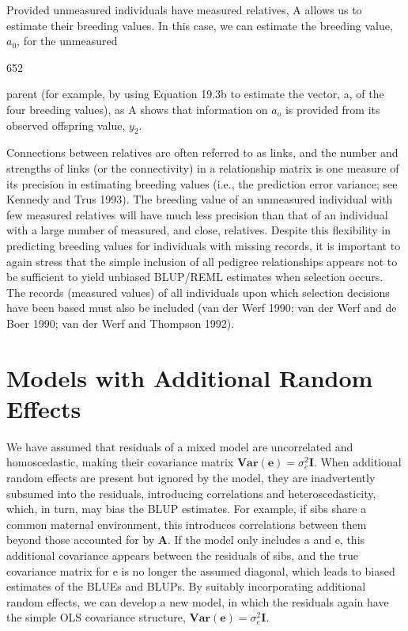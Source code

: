 \documentclass{article}
\begin{document}
Provided unmeasured individuals have measured relatives, A allows us to estimate their breeding values. In this case, we can estimate the breeding value,  $ a_{0} $, for the unmeasured

652

parent (for example, by using Equation 19.3b to estimate the vector, a, of the four breeding values), as A shows that information on  $ a_{o} $ is provided from its observed offspring value,  $ y_{2} $.

Connections between relatives are often referred to as links, and the number and strengths of links (or the connectivity) in a relationship matrix is one measure of its precision in estimating breeding values (i.e., the prediction error variance; see Kennedy and Trus 1993). The breeding value of an unmeasured individual with few measured relatives will have much less precision than that of an individual with a large number of measured, and close, relatives. Despite this flexibility in predicting breeding values for individuals with missing records, it is important to again stress that the simple inclusion of all pedigree relationships appears not to be sufficient to yield unbiased BLUP/REML estimates when selection occurs. The records (measured values) of all individuals upon which selection decisions have been based must also be included (van der Werf 1990; van der Werf and de Boer 1990; van der Werf and Thompson 1992).

\section{Models with Additional Random Effects}
We have assumed that residuals of a mixed model are uncorrelated and homoscedastic, making their covariance matrix  $ \mathbf{Var}(\mathbf{e}) = \sigma_e^2 \mathbf{I} $. When additional random effects are present but ignored by the model, they are inadvertently subsumed into the residuals, introducing correlations and heteroscedasticity, which, in turn, may bias the BLUP estimates. For example, if sibs share a common maternal environment, this introduces correlations between them beyond those accounted for by  $ \mathbf{A} $. If the model only includes a and e, this additional covariance appears between the residuals of sibs, and the true covariance matrix for e is no longer the assumed diagonal, which leads to biased estimates of the BLUEs and BLUPs. By suitably incorporating additional random effects, we can develop a new model, in which the residuals again have the simple OLS covariance structure,  $ \mathbf{Var}(\mathbf{e}) = \sigma_e^2 \mathbf{I} $.
\end{document}
